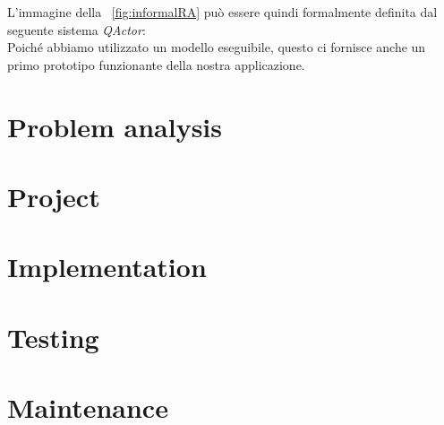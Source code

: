 \documentclass{../llncs}
\newcommand{\qa}{\textsf{\textit{QActor}}}
\newcommand{\labelsec}[1]{\label{sec:#1}}
\newcommand{\xf}[1]{\figurename~\ref{fig:#1}}
\begin{document}
L'immagine della \xf{informalRA} può essere quindi formalmente definita dal seguente sistema \qa:\\



Poiché abbiamo utilizzato un modello eseguibile, questo ci fornisce anche un primo prototipo funzionante della nostra applicazione.


\section{Problem analysis}
\labelsec{ProblemAnalysis}

\section{Project}
\labelsec{Project}

\section{Implementation}
\labelsec{Implementation}

\section{Testing}
\labelsec{Testing}

\section{Maintenance}
\labelsec{Maintenance}

\end{document}
